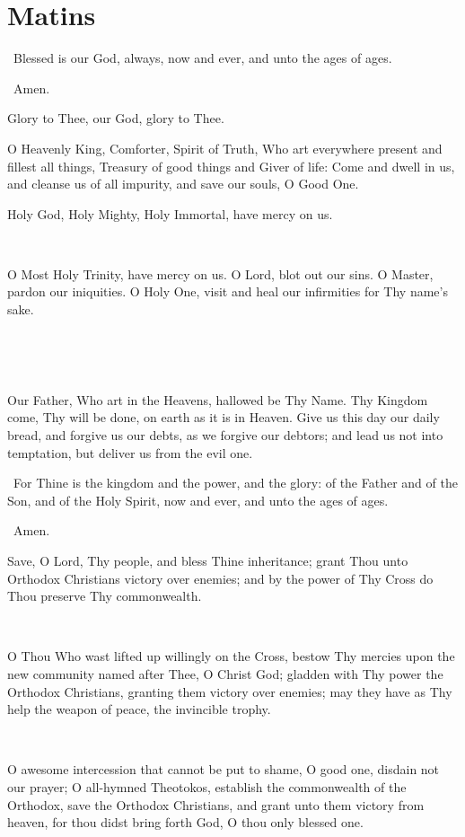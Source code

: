 \documentclass[
  14pt,
  letterpaper,
  openright,
  twocolumn,
  twoside]{memoir}
\begin{document}
\chapter*{Matins}

\priest\ Blessed is our God, always, now and ever, and unto the ages of ages.

\reader\ Amen.

Glory to Thee, our God, glory to Thee.

O Heavenly King, Comforter, Spirit of Truth, Who art everywhere present and fillest all things, Treasury of good things and Giver of life: Come and dwell in us, and cleanse us of all impurity, and save our souls, O Good One.

Holy God, Holy Mighty, Holy Immortal, have mercy on us. \thrice\

\glory\ \bothnow\

O Most Holy Trinity, have mercy on us. O Lord, blot out our sins. O Master, pardon our iniquities. O Holy One, visit and heal our infirmities for Thy name's sake.

\lhm\ \thrice

\glory\ \bothnow

Our Father, Who art in the Heavens, hallowed be Thy Name. Thy Kingdom come, Thy will be done, on earth as it is in Heaven. Give us this day our daily bread, and forgive us our debts, as we forgive our debtors; and lead us not into temptation, but deliver us from the evil one.

\priest\ For Thine is the kingdom and the power, and the glory: of the Father and of the Son, and of the Holy Spirit, now and ever, and unto the ages of ages.

\reader\ Amen.

Save, O Lord, Thy people, and bless Thine inheritance; grant Thou unto Orthodox Christians victory over enemies; and by the power of Thy Cross do Thou preserve Thy commonwealth.

\glory\

O Thou Who wast lifted up willingly on the Cross, bestow Thy mercies upon the new community named after Thee, O Christ God; gladden with Thy power the Orthodox Christians, granting them victory over enemies; may they have as Thy help the weapon of peace, the invincible trophy.

\bothnow\

O awesome intercession that cannot be put to shame, O good one, disdain not our prayer; O all-hymned Theotokos, establish the commonwealth of the Orthodox, save the Orthodox Christians, and grant unto them victory from heaven, for thou didst bring forth God, O thou only blessed one.
\end{document}
